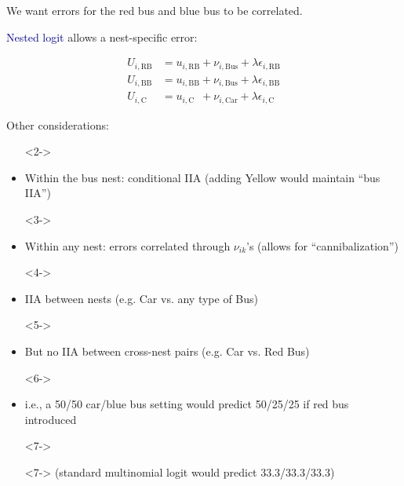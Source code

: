 \documentclass[aspectratio=169]{beamer}
\begin{document}
\begin{frame}

We want errors for the red bus and blue bus to be correlated.

\bigskip{}

\textcolor{navy}{Nested logit} allows a nest-specific error:

\begin{align*}
U_{i,\text{RB}} &= u_{i,\text{RB}} + \nu_{i,\text{Bus}} + \lambda \epsilon_{i,\text{RB}} \\
U_{i,\text{BB}} &= u_{i,\text{BB}} + \nu_{i,\text{Bus}} + \lambda \epsilon_{i,\text{BB}} \\
U_{i,\text{C}}  &= u_{i,\text{C}\phantom{C}}  + \nu_{i,\text{Car}} + \lambda \epsilon_{i,\text{C}}
\end{align*}

\bigskip{}


\end{frame}

\begin{frame}
Other considerations:

\begin{itemize}
   \item[]<2->
   \item<2-> Within the bus nest: conditional IIA (adding Yellow would maintain ``bus IIA'')
   \item[]<3->
   \item<3-> Within any nest: errors correlated through $\nu_{ik}$'s (allows for ``cannibalization'')
   \item[]<4->
   \item<4-> IIA between nests (e.g. Car vs. any type of Bus)
   \item[]<5->
   \item<5-> But no IIA between cross-nest pairs (e.g. Car vs. Red Bus)
   \item[]<6->
   \item<6-> i.e., a 50/50 car/blue bus setting would predict 50/25/25 if red bus introduced
   \item[]<7->
   \item[]<7-> (standard multinomial logit would predict 33.3/33.3/33.3)
\end{itemize}

\end{frame}
\end{document}
